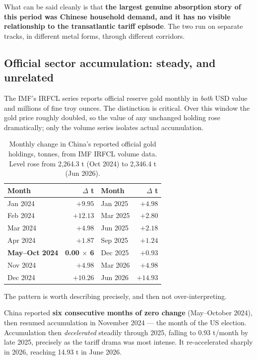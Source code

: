 \documentclass[11pt,a4paper]{article}
\begin{document}
What can be said cleanly is that \textbf{the largest genuine absorption story of this period was
Chinese household demand, and it has no visible relationship to the transatlantic tariff
episode}. The two run on separate tracks, in different metal forms, through different corridors.

\subsection{Official sector accumulation: steady, and unrelated}
\label{sec:official}

The IMF's IRFCL series reports official reserve gold monthly in \emph{both} USD value and
millions of fine troy ounces. The distinction is critical. Over this window the gold price
roughly doubled, so the value of any unchanged holding rose dramatically; only the volume
series isolates actual accumulation.

\begin{table}[h]
\centering
\begin{tabular}{@{}lr@{\hskip 2em}lr@{}}
\toprule
\textbf{Month} & \textbf{$\Delta$ t} & \textbf{Month} & \textbf{$\Delta$ t} \\
\midrule
Jan 2024 & $+9.95$ & Jan 2025 & $+4.98$ \\
Feb 2024 & $+12.13$ & Mar 2025 & $+2.80$ \\
Mar 2024 & $+4.98$ & Jun 2025 & $+2.18$ \\
Apr 2024 & $+1.87$ & Sep 2025 & $+1.24$ \\
\textbf{May--Oct 2024} & \textbf{0.00 $\times$ 6} & Dec 2025 & $+0.93$ \\
Nov 2024 & $+4.98$ & Mar 2026 & $+4.98$ \\
Dec 2024 & $+10.26$ & Jun 2026 & $+14.93$ \\
\bottomrule
\end{tabular}
\caption{Monthly change in China's reported official gold holdings, tonnes, from IMF IRFCL
volume data. Level rose from 2{,}264.3 t (Oct 2024) to 2{,}346.4 t (Jun 2026).}
\end{table}

The pattern is worth describing precisely, and then not over-interpreting.

China reported \textbf{six consecutive months of zero change} (May--October 2024), then resumed
accumulation in November 2024 --- the month of the US election. Accumulation then
\emph{decelerated} steadily through 2025, falling to 0.93 t/month by late 2025, precisely as
the tariff drama was most intense. It re-accelerated sharply in 2026, reaching 14.93 t in June
2026.
\end{document}
